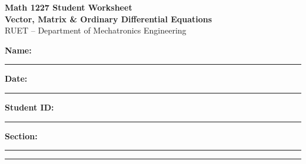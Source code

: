 

\begin{center}
{\LARGE \textbf{Math 1227 Student Worksheet}}\\[4pt]
{\large \textbf{Vector, Matrix \& Ordinary Differential Equations}}\\[6pt]
RUET -- Department of Mechatronics Engineering
\end{center}

\vspace{6pt}
\textbf{Name:} \rule{0.46\linewidth}{0.4pt}
\hfill
\textbf{Date:} \rule{0.24\linewidth}{0.4pt}

\textbf{Student ID:} \rule{0.32\linewidth}{0.4pt}
\hfill
\textbf{Section:} \rule{0.24\linewidth}{0.4pt}

\vspace{6pt}

\hrule
\vspace{8pt}
